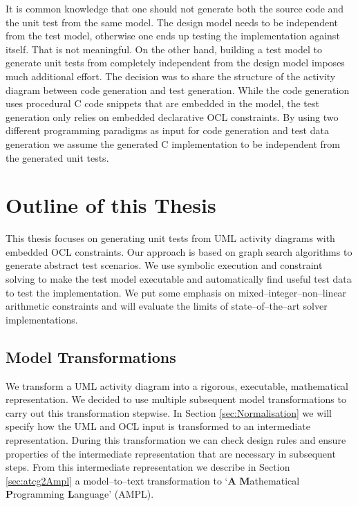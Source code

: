 It is common knowledge that one should not generate both the source code and the unit test from the same model. The design model needs to be independent from the test model, otherwise one ends up testing the implementation against itself. That is not meaningful. %
On the other hand, building a test model to generate unit tests from completely independent from the design model imposes much additional effort. The decision was to share the structure of the activity diagram between code generation and test generation. While the code generation uses procedural C code snippets that are embedded in the model, the test generation only relies on embedded declarative OCL constraints. By using two different programming paradigms as input for code generation and test data generation we assume the generated C implementation to be independent from the generated unit tests.
\section{Outline of this Thesis}
This thesis focuses on generating unit tests from UML activity diagrams with embedded OCL constraints. Our approach is based on graph search algorithms to generate abstract test scenarios. We use symbolic execution and constraint solving to make the test model executable and automatically find useful test data to test the implementation. We put some emphasis on mixed--integer--non--linear arithmetic constraints and will evaluate the limits of state--of--the--art solver implementations.
\subsection{Model Transformations}
We transform a UML activity diagram into a rigorous, executable, mathematical representation. We decided to use multiple subsequent model transformations to carry out this transformation stepwise. In Section \ref{sec:Normalisation} we will specify how the UML and OCL input is transformed to an intermediate representation. During this transformation we can check design rules and ensure properties of the intermediate representation that are necessary in subsequent steps. From this intermediate representation we describe in Section \ref{sec:atcg2Ampl} a model--to--text transformation to `\textbf{A} \textbf{M}athematical \textbf{P}rogramming \textbf{L}anguage' (AMPL).
